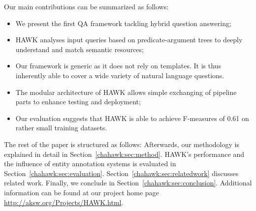 Our main contributions can be summarized as follows:
 \begin{itemize}
 \item We present the first QA framework tackling hybrid question answering;
 \item HAWK analyses input queries based on predicate-argument trees to deeply understand and match semantic resources;
 \item Our framework is generic as it does not rely on templates. It is thus inherently able to cover a wide variety of natural language questions. %
 \item The modular architecture of HAWK allows simple exchanging of pipeline parts to enhance testing and deployment;
 \item Our evaluation suggests that HAWK is able to achieve F-measures of 0.61 on rather small training datasets.
 \end{itemize}

The rest of the paper is structured as follows:
Afterwards, our methodology is explained in detail in Section~\ref{chahawk:sec:method}.
HAWK's performance and the influence of entity annotation systems is evaluated in Section~\ref{chahawk:sec:evaluation}. 
Section~\ref{chahawk:sec:relatedwork} discusses related work.  
Finally, we conclude in Section~\ref{chahawk:sec:conclusion}. Additional information can be found at our project home page \url{http://aksw.org/Projects/HAWK.html}.

%





